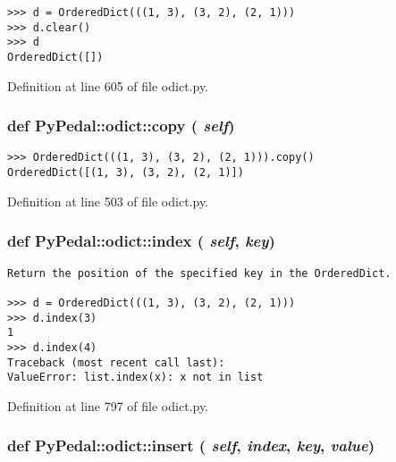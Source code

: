 \footnotesize\begin{verbatim}
>>> d = OrderedDict(((1, 3), (3, 2), (2, 1)))
>>> d.clear()
>>> d
OrderedDict([])
\end{verbatim}
\normalsize
 

Definition at line 605 of file odict.py.\hypertarget{namespacePyPedal_1_1odict_afd7852dbac962331ecc87f431e25d64}{
\subsubsection{\setlength{\rightskip}{0pt plus 5cm}def PyPedal::odict::copy ( {\em self})}}
\label{namespacePyPedal_1_1odict_afd7852dbac962331ecc87f431e25d64}




\footnotesize\begin{verbatim}
>>> OrderedDict(((1, 3), (3, 2), (2, 1))).copy()
OrderedDict([(1, 3), (3, 2), (2, 1)])
\end{verbatim}
\normalsize
 

Definition at line 503 of file odict.py.\hypertarget{namespacePyPedal_1_1odict_f1c72aeebe28f1a184b92f36e00e0c14}{
\subsubsection{\setlength{\rightskip}{0pt plus 5cm}def PyPedal::odict::index ( {\em self},  {\em key})}}
\label{namespacePyPedal_1_1odict_f1c72aeebe28f1a184b92f36e00e0c14}




\footnotesize\begin{verbatim}
Return the position of the specified key in the OrderedDict.

>>> d = OrderedDict(((1, 3), (3, 2), (2, 1)))
>>> d.index(3)
1
>>> d.index(4)
Traceback (most recent call last):
ValueError: list.index(x): x not in list
\end{verbatim}
\normalsize
 

Definition at line 797 of file odict.py.\hypertarget{namespacePyPedal_1_1odict_c2f375d34fe222e45ddac977b9c9f790}{
\subsubsection{\setlength{\rightskip}{0pt plus 5cm}def PyPedal::odict::insert ( {\em self},  {\em index},  {\em key},  {\em value})}}
\label{namespacePyPedal_1_1odict_c2f375d34fe222e45ddac977b9c9f790}




